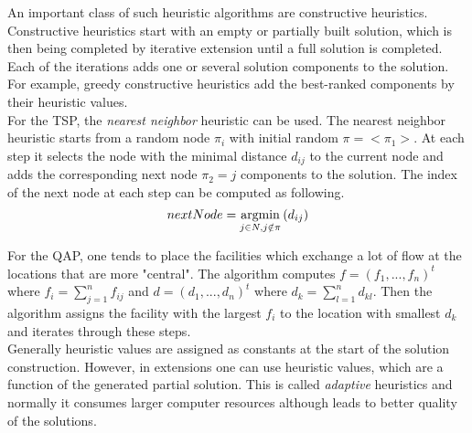 An important class of such heuristic algorithms are constructive heuristics. Constructive heuristics start with an empty or partially built solution, which is then being completed by iterative extension until a full solution is completed. Each of the iterations adds one or several solution components to the solution. For example, greedy constructive heuristics  add the best-ranked components by their heuristic values. \\

For the TSP, the \emph{nearest neighbor} heuristic can be used. The nearest neighbor heuristic starts from a random node $\pi_i$ with initial random $\pi=<\pi_1>$. At each step it selects the node with the minimal distance $d_{ij}$ to the current node and adds the corresponding next node $\pi_2=j$ components to the solution. The index of the next node at each step can be computed as following.\\

\begin{equation}
nextNode = \operatornamewithlimits{argmin} \limits_{j \in N, j \notin \pi} {(d_{ij})}
\end{equation}

For the QAP, one tends to place the facilities which exchange a lot of flow at the locations that are more "central". The algorithm computes $f=(f_1,...,f_n)^t$ where $f_i=\sum \limits_{j=1}^n {f_{ij}}$ and $d=(d_1,...,d_n)^t$ where $d_k=\sum \limits_{l=1}^n {d_{kl}}$. Then the algorithm assigns the facility with the largest $f_i$ to the location with smallest $d_k$ and iterates through these steps. \\

Generally heuristic values are assigned as constants at the start of the solution construction. However, in extensions one can use heuristic values, which are a function of the generated partial solution. This is called \emph{adaptive} heuristics and normally it consumes larger computer resources although leads to better quality of the solutions.